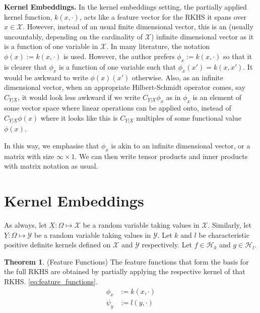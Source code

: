 \documentclass[twoside]{article} \usepackage{aistats2017}
\theoremstyle{definition}
\theoremstyle{definition}
\newtheorem{theorem}{Theorem}[section]
\theoremstyle{remark}
\newcommand{\rv}[1]{\underline{#1}}
\begin{document}
	\textbf{Kernel Embeddings.} In the kernel embeddings setting, the partially applied kernel function, $k(x, \cdot)$, acts like a feature vector for the RKHS it spans over $x \in \mathcal{X}$. However, instead of an usual finite dimensional vector, this is an (usually uncountably, depending on the cardinality of $\mathcal{X}$) infinite dimensional vector as it is a function of one variable in $\mathcal{X}$. In many literature, the notation $\phi(x) := k(x, \cdot)$ is used. However, the author prefers $\phi_{x} := k(x, \cdot)$ so that it is clearer that $\phi_{x}$ is a function of one variable such that $\phi_{x}(x') = k(x, x')$. It would be awkward to write $\phi(x)(x')$ otherwise. Also, as an infinite dimensional vector, when an appropriate Hilbert-Schmidt operator comes, say $C_{\rv{Y} | \rv{X}}$, it would look less awkward if we write $C_{\rv{Y} | \rv{X}} \phi_{x}$ as in $\phi_{x}$ is an element of some vector space where linear operations can be applied onto, instead of $C_{\rv{Y} | \rv{X}} \phi(x)$ where it looks like this is $C_{\rv{Y} | \rv{X}}$ multiples of some functional value $\phi(x)$.
	
	In this way, we emphasise that $\phi_{x}$ is akin to an infinite dimensional vector, or a matrix with size $\infty \times 1$. We can then write tensor products and inner products with matrix notation as usual.
	
\section{Kernel Embeddings}

	As always, let $\rv{X} : \Omega \mapsto \mathcal{X}$ be a random variable taking values in $\mathcal{X}$. Similarly, let $\rv{Y} : \Omega \mapsto \mathcal{Y}$ be a random variable taking values in $\mathcal{Y}$. Let $k$ and $l$ be characteristic positive definite kernels defined on $\mathcal{X}$ and $\mathcal{Y}$ respectively. Let $f \in \mathcal{H}_{k}$ and $g \in \mathcal{H}_{l}$.
		

	\begin{theorem} \label{thm:feature_functions}
		(Feature Functions)
		The feature functions that form the basis for the full RKHS are obtained by partially applying the respective kernel of that RKHS. \eqref{eq:feature_functions}.
		\begin{equation}
		\begin{aligned}
			\phi_{x} &:= k(x, \cdot) \\
			\psi_{y} &:= l(y, \cdot)
		\label{eq:feature_functions}
		\end{aligned}
		\end{equation}
	\end{theorem}
\end{document}
